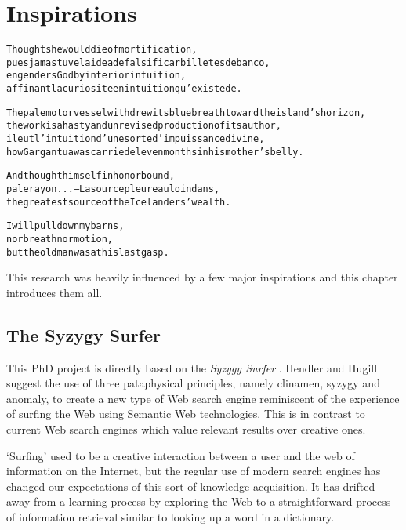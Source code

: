 
\chapter{Inspirations}
\label{ch:inspirations}

\startcontents[chapters]

\vfill

\begin{alltt}\sffamily
Thought she would die of mortification,
pues jamas tuve la idea de falsificar billetes de banco,
engenders God by interior intuition,
affinant la curiosite en intuition qu'existe de.

The pale motor vessel withdrew its blue breath toward the island's horizon,
the work is a hasty and unrevised production of its author,
il eut l'intuition d'une sorte d'impuissance divine,
how Gargantua was carried eleven months in his mother's belly.

And thought himself in honor bound,
pale rayon ... -- La source pleure au loin dans,
the greatest source of the Icelanders' wealth.

I will pull down my barns,
nor breath nor motion,
but the old man was at his last gasp.
\end{alltt}

\newpage
\minicontents
\spirals

This research was heavily influenced by a few major inspirations and this chapter introduces them all.


\section{The Syzygy Surfer}
\label{s:surfer}

This PhD project is directly based on the \textit{Syzygy Surfer} \autocite{Hendler2011, Hendler2013}. Hendler and Hugill suggest the use of three pataphysical principles, namely clinamen, syzygy and anomaly, to create a new type of Web search engine reminiscent of the experience of surfing the Web using Semantic Web technologies. This is in contrast to current Web search engines which value relevant results over creative ones.

`Surfing' used to be a creative interaction between a user and the web of information on the Internet, but the regular use of modern search engines has changed our expectations of this sort of knowledge acquisition. It has drifted away from a learning process by exploring the Web to a straightforward process of information retrieval similar to looking up a word in a dictionary.

